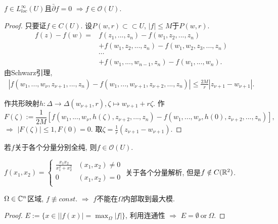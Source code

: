 \begin{theorem}[Osgood]
    $f \in L^{\infty }_{loc}(U)$且$\bar{\partial }f=0 $ $\Rightarrow f \in \mathcal{O}(U). $ 
\end{theorem}
\begin{proof}
  只要证$f\in C(U)$.
  设$P(w,r) \subset \subset U$, $|f|\leq M$于$P(w,r)$.
  \begin{align*}
    f(z)-f(w)=& f(z_1,...,z_n)-f(w_1, z_2,...,z_n)\\
    &+ f(w_1,z_2,...,z_n)-f(w_1,w_2,z_3,...,z_n)\\
    & \cdots \\
    &+f(w_1,...,w_{n-1},z_n)-f(w_1,...,w_n).
  \end{align*} 
  由Schwarz引理,
  \begin{align*}
    |f(w_1,...,w_\nu ,z_{\nu +1},...,z_n)- f(w_1,...,w_{\nu+1} ,z_{\nu +2},...,z_n)| \leq \frac{2M}{r}|z_{\nu +1}-w_{\nu +1}|.
  \end{align*} 


作共形映射$h:\Delta \to \Delta (w_{\nu +1},r), \zeta \mapsto w_{\nu +1}+r \zeta .$
作
$$F(\zeta ):=\frac{1}{2M}[f(w_1,...,w_\nu ,h(\zeta ), z_{\nu +2},...,z_n)-f(w_1,...,w_\nu ,h(0 ), z_{\nu +2},...,z_n)],$$
$\Rightarrow $ $|F(\zeta )|\leq 1,F(0)=0. $ 取$\zeta =\frac{1}{r}(z_{\nu +1}-w_{\nu +1})$.
\end{proof}

\begin{theorem}
   若$f$关于各个分量分别全纯, 则$f\in \mathcal{O}(U)$. 
\end{theorem}

\begin{example}
  $f(x_1,x_2)= \begin{cases}
    \frac{x_1x_2}{x_1^2+x_2^2} &\text{} (x_1,x_2) \neq 0\\
    0 &\text{} (x_1,x_2) = 0\\
  \end{cases} $ 
  关于各个分量解析, 但是$f \notin C({\mathbb R}^2)$.
\end{example}

\begin{theorem}[最大模定理]
    $\Omega \in {\mathbb C}^n$区域, $f \not \equiv const$. 
    $\Rightarrow $ $f$不能在$\Omega $内部取到最大模.    
\end{theorem}
\begin{proof}
  $E:=\{x \in | |f(x)|=\max_{\Omega } |f|\}$,  利用连通性 $\Rightarrow $ $E=\emptyset ~ \text{or} ~ \Omega $. 
\end{proof}

